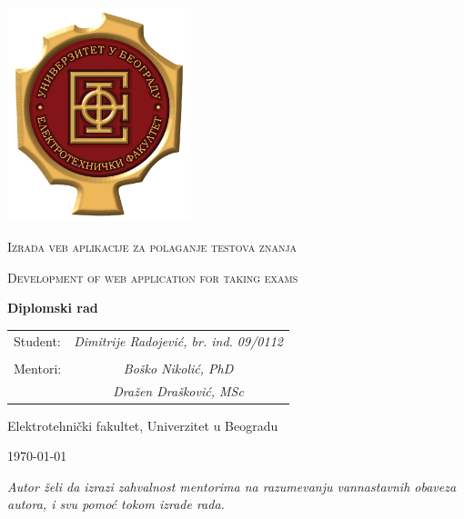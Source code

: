 \documentclass[12pt,a4paper,titlepage]{report}
\begin{document}
\begin{titlepage}
\centering
\includegraphics[width=0.4\textwidth]{etf}\par
\vspace{1cm}
{\scshape\Huge Izrada veb aplikacije za polaganje testova znanja \par}
\vspace{0.5cm}
{\scshape\Large Development of web application for taking exams \par}
\vspace{1cm}
{\bfseries\large Diplomski rad \par}
\vspace{1cm}
\begin{tabularx}{0.8\textwidth}{l c}
Student: \hfill & \itshape Dimitrije Radojević, br. ind. 09/0112 \\
\hfill & \hfill \\
Mentori: \hfill & \itshape Boško Nikolić, PhD \\
\hfill & \itshape Dražen Drašković, MSc
\end{tabularx}
\vfill
{Elektrotehnički fakultet, Univerzitet u Beogradu \par}
\today
\end{titlepage}

\cleardoublepage
{}
\vspace*{\fill}
\begin{center}
\textit{Autor želi da izrazi zahvalnost mentorima na razumevanju vannastavnih obaveza autora, i svu pomoć tokom izrade rada.}
\end{center}
\vspace*{\fill}

\tableofcontents







\renewcommand\bibname{Reference}
\printbibliography
\end{document}
